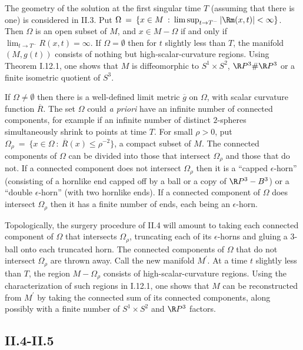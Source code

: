 The geometry of the solution at the first singular time $T$
(assuming that there is one) is considered in II.3.  Put
$\Omega \: = \: \{x \in M \: : \: \limsup_{t \rightarrow T^-}
|\Rm(x,t)| < \infty \}$. Then $\Omega$ is an open subset of $M$,
and $x \in M-\Omega$ if and only if $\lim_{t \rightarrow T^-}
R(x,t) = \infty$. If $\Omega = \emptyset$ then for $t$ slightly less than $T$,
the manifold $(M, g(t))$ consists of nothing but high-scalar-curvature
regions. Using Theorem I.12.1, one shows that
$M$ is diffeomorphic to
$S^1 \times S^2$, $\R P^3 \# \R P^3$ or
a finite isometric quotient of $S^3$.

If $\Omega \neq \emptyset$ then there is a well-defined limit
metric $\overline{g}$ on $\Omega$, with scalar curvature
function $\overline{R}$. The set $\Omega$
could {\it a priori} have an infinite number of connected components,
for example if an infinite number of distinct $2$-spheres simultaneously
shrink to points at time $T$. For small $\rho > 0$,
put $\Omega_\rho \: = \: \{x \in \Omega \: : \: \overline{R}(x) \le \rho^{-2} \}$,
a compact subset of $M$.
The connected components of $\Omega$ can be divided into those
that intersect $\Omega_\rho$ and those that do not.  If a connected
component does not intersect $\Omega_\rho$ then it is a
``capped $\epsilon$-horn'' (consisting of a hornlike end capped off by a ball
or a copy of $\R P^3 - B^3$) or a ``double $\epsilon$-horn'' (with two
hornlike ends). If a connected component of $\Omega$ does intersect
$\Omega_\rho$ then it has a finite number of ends, each being
an $\epsilon$-horn.

Topologically, the surgery procedure of II.4 will amount to taking each
connected component of $\Omega$ that intersects $\Omega_\rho$,
truncating each of its $\epsilon$-horns and gluing a $3$-ball onto
each truncated horn.
The connected components of $\Omega$ that do not intersect
$\Omega_\rho$ are thrown away.
Call the new manifold $M^\prime$. At a time
$t$ slightly less than $T$, the region $M - \Omega_\rho$ consists
of high-scalar-curvature regions. Using the characterization of such
regions in I.12.1, one shows that $M$ can be reconstructed from
$M^\prime$ by taking the connected sum of its connected components,
along possibly with a finite number of $S^1 \times S^2$ and
$\R P^3$ factors.

\subsection{II.4-II.5}

